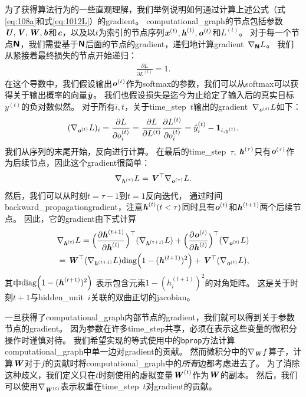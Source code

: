 为了获得算法行为的一些直观理解，我们举例说明如何通过计算上述公式（式\eqref{eq:108a}和式\eqref{eq:1012L}）的\gls{gradient}。
\gls{computational_graph}的节点包括参数$\boldsymbol{\mathit{U}},\boldsymbol{\mathit{V}},\boldsymbol{\mathit{W}}, \boldsymbol{\mathit{b}}$和$\boldsymbol{\mathit{c}}$，以及以$t$为索引的节点序列$\boldsymbol{\mathit{x}}^{(t)}, \boldsymbol{\mathit{h}}^{(t)},\boldsymbol{\mathit{o}}^{(t)}$和$L^{(t)}$。
对于每一个节点$\textsf{\textbf{N}}$，我们需要基于$\textsf{\textbf{N}}$后面的节点的\gls{gradient}，递归地计算\gls{gradient}~$\nabla_{\textsf{\textbf{N}}} L$。
我们从紧接着最终损失的节点开始递归：
\begin{align}
 \frac{\partial L}{\partial L^{(t)}} = 1.
\end{align}
在这个导数中，我们假设输出$\boldsymbol{\mathit{o}}^{(t)}$作为\gls{softmax}的参数，我们可以从\gls{softmax}可以获得关于输出概率的向量$\hat{\boldsymbol{\mathit{y}}}$。
我们也假设损失是迄今为止给定了输入后的真实目标$y^{(t)}$的负对数似然。
对于所有$i,t$，关于\gls{time_step}~$t$输出的\gls{gradient}~$\nabla_{\boldsymbol{\mathit{o}}^{(t)}} L$如下：
\begin{align}
 (\nabla_{\boldsymbol{\mathit{o}}^{(t)}} L)_i =  \frac{\partial L}{\partial o_i^{(t)}} 
 =  \frac{\partial L}{\partial L^{(t)}}  \frac{\partial L^{(t)}}{\partial o_i^{(t)}}  
 = \hat y_i^{(t)} - \mathbf{1}_{i,y^{(t)}}.
\end{align}
我们从序列的末尾开始，反向进行计算。
在最后的\gls{time_step}~$\tau$, $\boldsymbol{\mathit{h}}^{(\tau)}$只有$\boldsymbol{\mathit{o}}^{(\tau)}$作为后续节点，因此这个\gls{gradient}很简单：
\begin{align}
 \nabla_{\boldsymbol{\mathit{h}}^{(\tau)}} L = \boldsymbol{\mathit{V}}^\top \nabla_{\boldsymbol{\mathit{o}}^{(\tau)}} L.
\end{align}
然后，我们可以从时刻$t=\tau-1$到$t=1$反向迭代， 通过时间\gls{backward_propagation}\gls{gradient}，注意$\boldsymbol{\mathit{h}}^{(t)}(t < \tau)$同时具有$\boldsymbol{\mathit{o}}^{(t)}$和$\boldsymbol{\mathit{h}}^{(t+1)}$两个后续节点。
因此，它的\gls{gradient}由下式计算
\begin{align}
  \nabla_{\boldsymbol{\mathit{h}}^{(t)}} L = \Big( \frac{\partial \boldsymbol{\mathit{h}}^{(t+1)}}{ \partial \boldsymbol{\mathit{h}}^{(t)}}  \Big)^\top(\nabla_{\boldsymbol{\mathit{h}}^{(t+1)}} L) 
  + \Big( \frac{\partial \boldsymbol{\mathit{o}}^{(t)}}{ \partial \boldsymbol{\mathit{h}}^{(t)}}  \Big)^\top (\nabla_{\boldsymbol{\mathit{o}}^{(t)}} L) \\
  = \boldsymbol{\mathit{W}}^\top (\nabla_{\boldsymbol{\mathit{h}}^{(t+1)}} L) \text{diag} \Big( 1 - (\boldsymbol{\mathit{h}}^{(t+1)})^2 \Big) 
    + \boldsymbol{\mathit{V}}^\top ( \nabla_{\boldsymbol{\mathit{o}}^{(t)}} L ),
\end{align}
其中$\text{diag} \Big( 1 - (\boldsymbol{\mathit{h}}^{(t+1)})^2 \Big) $ 表示包含元素$1 - (h_i^{(t+1)})^2$的对角矩阵。
这是关于时刻$t+1$与\gls{hidden_unit}~$i$关联的双曲正切的\gls{jacobian}。


一旦获得了\gls{computational_graph}内部节点的\gls{gradient}，我们就可以得到关于参数节点的\gls{gradient}。
因为参数在许多\gls{time_step}共享，必须在表示这些变量的微积分操作时谨慎对待。
我们希望实现的等式使用中的{\tt bprop}方法计算\gls{computational_graph}中单一边对\gls{gradient}的贡献。
然而微积分中的$\nabla_{\boldsymbol{\mathit{W}}} f$算子，计算$\boldsymbol{\mathit{W}}$对于$f$的贡献时将\gls{computational_graph}中的\emph{所有}边都考虑进去了。
为了消除这种歧义，我们定义只在$t$时刻使用的虚拟变量$\boldsymbol{\mathit{W}}^{(t)}$作为$\boldsymbol{\mathit{W}}$的副本。
然后，我们可以使用$\nabla_{\boldsymbol{\mathit{W}}^{(t)}}$表示权重在\gls{time_step}~$t$对\gls{gradient}的贡献。

